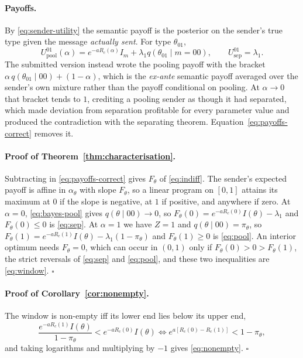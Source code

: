 \documentclass[sigconf,review]{acmart}
\begin{document}
\paragraph{Payoffs.}
By \eqref{eq:sender-utility} the semantic payoff is the posterior on the sender's true type
given the message \emph{actually sent}. For type $\theta_{01}$,
\begin{equation}
U^{01}_{\text{pool}}(\alpha)=e^{-aR_c(\alpha)}I_m+\lambda_1 q(\theta_{01}\mid m=00),
\qquad
U^{01}_{\text{sep}}=\lambda_1 .
\label{eq:payoffs-correct}
\end{equation}
The submitted version instead wrote the pooling payoff with the bracket
$\alpha\,q(\theta_{01}\mid 00)+(1-\alpha)$, which is the \emph{ex-ante} semantic payoff
averaged over the sender's own mixture rather than the payoff conditional on pooling. At
$\alpha\to0$ that bracket tends to $1$, crediting a pooling sender as though it had
separated, which made deviation from separation profitable for every parameter value and
produced the contradiction with the separating theorem. Equation~\eqref{eq:payoffs-correct}
removes it.

\paragraph{Proof of Theorem~\ref{thm:characterisation}.}
Subtracting in \eqref{eq:payoffs-correct} gives $F_\theta$ of \eqref{eq:indiff}. The
sender's expected payoff is affine in $\alpha_\theta$ with slope $F_\theta$, so a linear
program on $[0,1]$ attains its maximum at $0$ if the slope is negative, at $1$ if positive,
and anywhere if zero. At $\alpha=0$, \eqref{eq:bayes-pool} gives
$q(\theta\mid 00)\to 0$, so $F_\theta(0)=e^{-aR_c(0)}I(\theta)-\lambda_1$ and
$F_\theta(0)\le0$ is \eqref{eq:sep}. At $\alpha=1$ we have $Z=1$ and
$q(\theta\mid 00)=\pi_\theta$, so $F_\theta(1)=e^{-aR_c(1)}I(\theta)-\lambda_1(1-\pi_\theta)$
and $F_\theta(1)\ge0$ is \eqref{eq:pool}. An interior optimum needs $F_\theta=0$, which can
occur in $(0,1)$ only if $F_\theta(0)>0>F_\theta(1)$, the strict reversals of
\eqref{eq:sep} and \eqref{eq:pool}, and these two inequalities are \eqref{eq:window}.
\hfill$\square$

\paragraph{Proof of Corollary~\ref{cor:nonempty}.}
The window is non-empty iff its lower end lies below its upper end,
\begin{equation}
\frac{e^{-aR_c(1)}I(\theta)}{1-\pi_\theta}<e^{-aR_c(0)}I(\theta)
\iff e^{a[R_c(0)-R_c(1)]}<1-\pi_\theta ,
\end{equation}
and taking logarithms and multiplying by $-1$ gives \eqref{eq:nonempty}. \hfill$\square$
\end{document}
